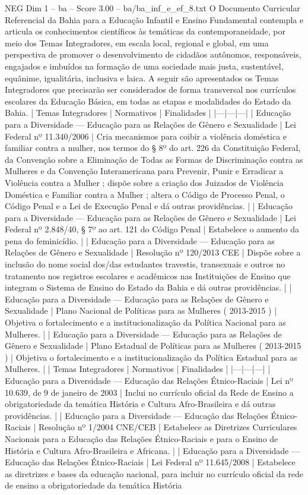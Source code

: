 \begin{textsample}{NEG Dim 1 – ba – Score 3.00 – ba/ba\_inf\_e\_ef\_8.txt}  \label{ex:f1_neg_184}
O Documento Curricular Referencial da Bahia para a Educação Infantil e Ensino Fundamental contempla e articula os conhecimentos científicos às temáticas da contemporaneidade, por meio dos Temas Integradores, em escala local, regional e global, em uma perspectiva de promover o desenvolvimento de cidadãos autônomos, responsáveis, engajados e imbuídos na formação de uma sociedade mais justa, sustentável, equânime, igualitária, inclusiva e laica.
A seguir são apresentados os Temas Integradores que precisarão ser considerados de forma transversal nos currículos escolares da Educação Básica, em todas as etapas e modalidades do Estado da Bahia. | Temas Integradores | Normativos | Finalidades | |---|---|---| | Educação para a Diversidade — Educação para as Relações de Gênero e Sexualidade | Lei Federal nº 11.340/2006 | Cria mecanismos para coibir a violência doméstica e familiar contra a mulher, nos termos do § 8º do art. 226 da Constituição Federal, da Convenção sobre a Eliminação de Todas as Formas de Discriminação contra as Mulheres e da Convenção Interamericana para Prevenir, Punir e Erradicar a Violência contra a Mulher ; dispõe sobre a criação dos Juizados de Violência Doméstica e Familiar contra a Mulher ; altera o Código de Processo Penal, o Código Penal e a Lei de Execução Penal e dá outras providências. | | Educação para a Diversidade — Educação para as Relações de Gênero e Sexualidade | Lei Federal nº 2.848/40, § 7º ao art. 121 do Código Penal | Estabelece o aumento da pena do feminicídio. | | Educação para a Diversidade — Educação para as Relações de Gênero e Sexualidade | Resolução nº 120/2013 CEE | Dispõe sobre a inclusão do nome social dos/das estudantes travestis, transexuais e outros no tratamento nos registros escolares e acadêmicos nas Instituições de Ensino que integram o Sistema de Ensino do Estado da Bahia e dá outras providências. | | Educação para a Diversidade — Educação para as Relações de Gênero e Sexualidade | Plano Nacional de Políticas para as Mulheres ( 2013-2015 ) | Objetiva o fortalecimento e a institucionalização da Política Nacional para as Mulheres. | | Educação para a Diversidade — Educação para as Relações de Gênero e Sexualidade | Plano Estadual de Políticas para as Mulheres ( 2013-2015 ) | Objetiva o fortalecimento e a institucionalização da Política Estadual para as Mulheres. | | Temas Integradores | Normativos | Finalidades | |---|---|---| | Educação para a Diversidade — Educação das Relações Étnico-Raciais | Lei nº 10.639, de 9 de janeiro de 2003 | Inclui no currículo oficial da Rede de Ensino a obrigatoriedade da temática História e Cultura Afro-Brasileira e dá outras providências. | | Educação para a Diversidade — Educação das Relações Étnico-Raciais | Resolução nº 1/2004 CNE/CEB | Estabelece as Diretrizes Curriculares Nacionais para a Educação das Relações Étnico-Raciais e para o Ensino de História e Cultura Afro-Brasileira e Africana. | | Educação para a Diversidade — Educação das Relações Étnico-Raciais | Lei Federal nº 11.645/2008 | Estabelece as diretrizes e bases da educação nacional, para incluir no currículo oficial da rede de ensino a obrigatoriedade da temática História 
\end{textsample}
